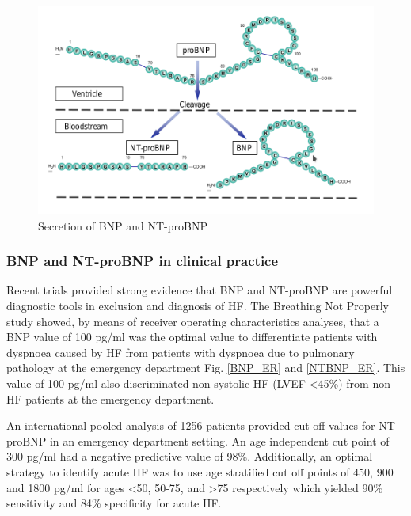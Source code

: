 \documentclass[14pt,a4paper,onecolumn]{extarticle}
\begin{document}
\begin{figure}

    \centering

    \includegraphics[scale=0.4]{../../images/BNP_secretion.png}

    \small\caption{Secretion of BNP and NT-proBNP}

    \label{BNP_secretion}

\end{figure}



\subsubsection{BNP and NT-proBNP in clinical practice}



Recent trials provided strong evidence that BNP and NT-proBNP are powerful diagnostic tools in exclusion and diagnosis of HF. The Breathing Not Properly study showed, by means of receiver operating characteristics analyses, that a BNP value of 100 pg/ml was the optimal value to differentiate patients with dyspnoea caused by HF from patients with dyspnoea due to pulmonary pathology at the emergency department Fig. \ref{BNP_ER} and \ref{NTBNP_ER}.  This value of 100 pg/ml also discriminated non-systolic HF (LVEF <45\%) from non-HF patients at the emergency department. \citep{Maisel2002}



 An international pooled analysis of 1256 patients provided cut off values for NT-proBNP in an emergency department setting. An age independent cut point of 300 pg/ml had a negative predictive value of 98\%.  Additionally, an optimal strategy to identify acute HF was to use age stratified cut off points of 450, 900 and 1800 pg/ml for ages <50, 50-75, and >75 respectively which yielded 90\% sensitivity and 84\% specificity for acute HF. \citep{Januzzi2006a}
\end{document}
